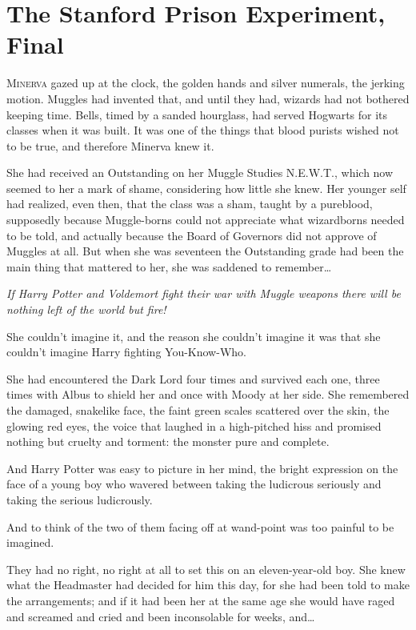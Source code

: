 \chapter{The Stanford Prison Experiment, Final}

\lettrine{M}{inerva} gazed up at the clock, the golden hands and silver numerals, the jerking motion. Muggles had invented that, and until they had, wizards had not bothered keeping time. Bells, timed by a sanded hourglass, had served Hogwarts for its classes when it was built. It was one of the things that blood purists wished not to be true, and therefore Minerva knew it.

She had received an Outstanding on her Muggle Studies N.E.W.T., which now seemed to her a mark of shame, considering how little she knew. Her younger self had realized, even then, that the class was a sham, taught by a pureblood, supposedly because Muggle-borns could not appreciate what wizardborns needed to be told, and actually because the Board of Governors did not approve of Muggles at all. But when she was seventeen the Outstanding grade had been the main thing that mattered to her, she was saddened to remember{\ldots}

\emph{If Harry Potter and Voldemort fight their war with Muggle weapons there will be nothing left of the world but fire!}

She couldn't imagine it, and the reason she couldn't imagine it was that she couldn't imagine Harry fighting You-Know-Who.

She had encountered the Dark Lord four times and survived each one, three times with Albus to shield her and once with Moody at her side. She remembered the damaged, snakelike face, the faint green scales scattered over the skin, the glowing red eyes, the voice that laughed in a high-pitched hiss and promised nothing but cruelty and torment: the monster pure and complete.

And Harry Potter was easy to picture in her mind, the bright expression on the face of a young boy who wavered between taking the ludicrous seriously and taking the serious ludicrously.

And to think of the two of them facing off at wand-point was too painful to be imagined.

They had no right, no right at all to set this on an eleven-year-old boy. She knew what the Headmaster had decided for him this day, for she had been told to make the arrangements; and if it had been her at the same age she would have raged and screamed and cried and been inconsolable for weeks, and{\ldots}

